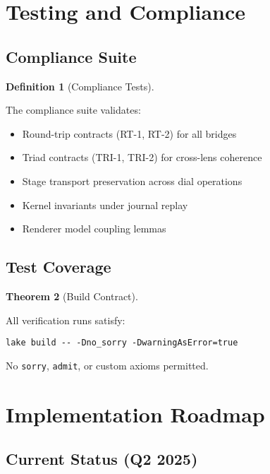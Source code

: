 \documentclass{amsart}
\theoremstyle{definition}
\newtheorem{definition}{Definition}[section]
\newtheorem{theorem}[definition]{Theorem}
\theoremstyle{remark}
\begin{document}
\section{Testing and Compliance}

\subsection{Compliance Suite}
\label{sec:compliance}

\begin{definition}[Compliance Tests]
\label{def:compliance-tests}

The compliance suite validates:
\begin{itemize}
\item Round-trip contracts (RT-1, RT-2) for all bridges
\item Triad contracts (TRI-1, TRI-2) for cross-lens coherence
\item Stage transport preservation across dial operations
\item Kernel invariants under journal replay
\item Renderer model coupling lemmas
\end{itemize}
\end{definition}

\subsection{Test Coverage}
\label{sec:test-coverage}

\begin{theorem}[Build Contract]
\label{thm:build-contract}

All verification runs satisfy:
\begin{verbatim}
lake build -- -Dno_sorry -DwarningAsError=true
\end{verbatim}
No \texttt{sorry}, \texttt{admit}, or custom axioms permitted.
\end{theorem}

\section{Implementation Roadmap}

\subsection{Current Status (Q2 2025)}
\end{document}
